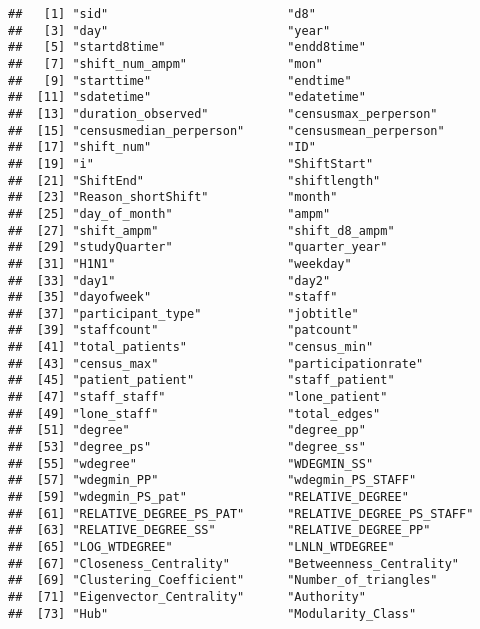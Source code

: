 \documentclass[]{elsarticle} %
\begin{document}
\begin{verbatim}
##   [1] "sid"                         "d8"                         
##   [3] "day"                         "year"                       
##   [5] "startd8time"                 "endd8time"                  
##   [7] "shift_num_ampm"              "mon"                        
##   [9] "starttime"                   "endtime"                    
##  [11] "sdatetime"                   "edatetime"                  
##  [13] "duration_observed"           "censusmax_perperson"        
##  [15] "censusmedian_perperson"      "censusmean_perperson"       
##  [17] "shift_num"                   "ID"                         
##  [19] "i"                           "ShiftStart"                 
##  [21] "ShiftEnd"                    "shiftlength"                
##  [23] "Reason_shortShift"           "month"                      
##  [25] "day_of_month"                "ampm"                       
##  [27] "shift_ampm"                  "shift_d8_ampm"              
##  [29] "studyQuarter"                "quarter_year"               
##  [31] "H1N1"                        "weekday"                    
##  [33] "day1"                        "day2"                       
##  [35] "dayofweek"                   "staff"                      
##  [37] "participant_type"            "jobtitle"                   
##  [39] "staffcount"                  "patcount"                   
##  [41] "total_patients"              "census_min"                 
##  [43] "census_max"                  "participationrate"          
##  [45] "patient_patient"             "staff_patient"              
##  [47] "staff_staff"                 "lone_patient"               
##  [49] "lone_staff"                  "total_edges"                
##  [51] "degree"                      "degree_pp"                  
##  [53] "degree_ps"                   "degree_ss"                  
##  [55] "wdegree"                     "WDEGMIN_SS"                 
##  [57] "wdegmin_PP"                  "wdegmin_PS_STAFF"           
##  [59] "wdegmin_PS_pat"              "RELATIVE_DEGREE"            
##  [61] "RELATIVE_DEGREE_PS_PAT"      "RELATIVE_DEGREE_PS_STAFF"   
##  [63] "RELATIVE_DEGREE_SS"          "RELATIVE_DEGREE_PP"         
##  [65] "LOG_WTDEGREE"                "LNLN_WTDEGREE"              
##  [67] "Closeness_Centrality"        "Betweenness_Centrality"     
##  [69] "Clustering_Coefficient"      "Number_of_triangles"        
##  [71] "Eigenvector_Centrality"      "Authority"                  
##  [73] "Hub"                         "Modularity_Class"           

\end{verbatim}
\end{document}
